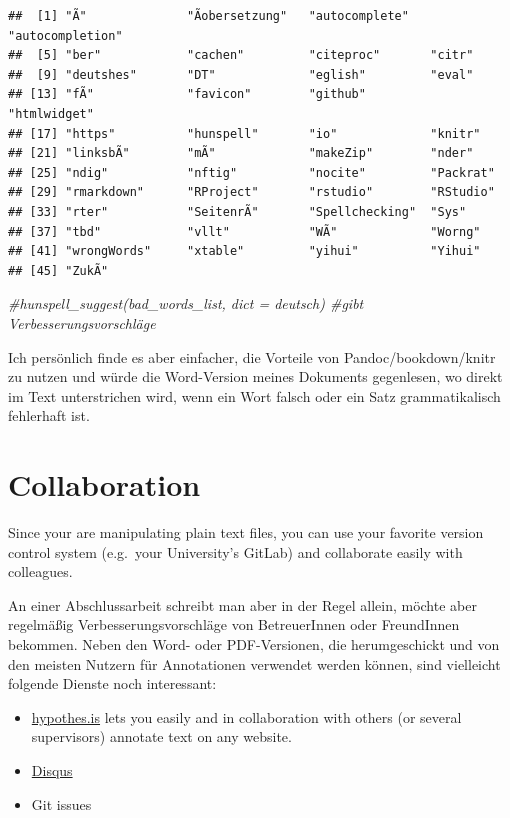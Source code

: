 \documentclass[]{book}
\makeatletter
\newenvironment{Shaded}{\begin{snugshade}}{\end{snugshade}}
\newcommand{\CommentTok}[1]{\textcolor[rgb]{0.56,0.35,0.01}{\textit{{#1}}}}
\providecommand{\tightlist}{%
  \setlength{\itemsep}{0pt}\setlength{\parskip}{0pt}}
\newenvironment{kframe}{%
\medskip{}
\setlength{\fboxsep}{.8em}
 \def\at@end@of@kframe{}%
 \ifinner\ifhmode%
  \def\at@end@of@kframe{\end{minipage}}%
  \begin{minipage}{\columnwidth}%
 \fi\fi%
 \def\FrameCommand##1{\hskip\@totalleftmargin \hskip-\fboxsep
 \colorbox{shadecolor}{##1}\hskip-\fboxsep
     \hskip-\linewidth \hskip-\@totalleftmargin \hskip\columnwidth}%
 \MakeFramed {\advance\hsize-\width
   \@totalleftmargin\z@ \linewidth\hsize
   \@setminipage}}%
 {\par\unskip\endMakeFramed%
 \at@end@of@kframe}
\renewenvironment{Shaded}{\begin{kframe}}{\end{kframe}}
\theoremstyle{definition}
\theoremstyle{definition}
\theoremstyle{remark}
\makeatother
\begin{document}
\begin{verbatim}
##  [1] "Ã"              "Ãobersetzung"   "autocomplete"   "autocompletion"
##  [5] "ber"            "cachen"         "citeproc"       "citr"          
##  [9] "deutshes"       "DT"             "eglish"         "eval"          
## [13] "fÃ"             "favicon"        "github"         "htmlwidget"    
## [17] "https"          "hunspell"       "io"             "knitr"         
## [21] "linksbÃ"        "mÃ"             "makeZip"        "nder"          
## [25] "ndig"           "nftig"          "nocite"         "Packrat"       
## [29] "rmarkdown"      "RProject"       "rstudio"        "RStudio"       
## [33] "rter"           "SeitenrÃ"       "Spellchecking"  "Sys"           
## [37] "tbd"            "vllt"           "WÃ"             "Worng"         
## [41] "wrongWords"     "xtable"         "yihui"          "Yihui"         
## [45] "ZukÃ"
\end{verbatim}

\begin{Shaded}
\begin{Highlighting}[]
\CommentTok{#hunspell_suggest(bad_words_list, dict = deutsch) #gibt Verbesserungsvorschläge}
\end{Highlighting}
\end{Shaded}

Ich persönlich finde es aber einfacher, die Vorteile von
Pandoc/bookdown/knitr zu nutzen und würde die Word-Version meines
Dokuments gegenlesen, wo direkt im Text unterstrichen wird, wenn ein
Wort falsch oder ein Satz grammatikalisch fehlerhaft ist.

\section{Collaboration}\label{collaboration}

Since your are manipulating plain text files, you can use your favorite
version control system (e.g.~your University's GitLab) and collaborate
easily with colleagues.

An einer Abschlussarbeit schreibt man aber in der Regel allein, möchte
aber regelmäßig Verbesserungsvorschläge von BetreuerInnen oder
FreundInnen bekommen. Neben den Word- oder PDF-Versionen, die
herumgeschickt und von den meisten Nutzern für Annotationen verwendet
werden können, sind vielleicht folgende Dienste noch interessant:

\begin{itemize}
\tightlist
\item
  \href{https://web.hypothes.is/}{hypothes.is} lets you easily and in
  collaboration with others (or several supervisors) annotate text on
  any website.
\item
  \href{https://disqus.com/}{Disqus}
\item
  Git issues
\end{itemize}
\end{document}
